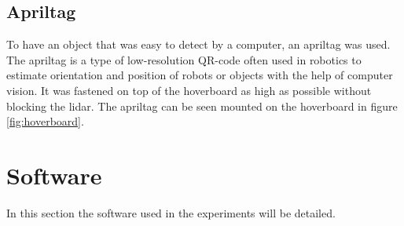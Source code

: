 \documentclass[nofilelist]{cslthse-msc}
\begin{document}
\subsection{Apriltag}
To have an object that was easy to detect by a computer, an apriltag was used. The apriltag is a type of low-resolution QR-code often used in robotics to estimate orientation and position of robots or objects with the help of computer vision. It was fastened on top of the hoverboard as high as possible without blocking the lidar. The apriltag can be seen mounted on the hoverboard in figure \ref{fig:hoverboard}.




\section{Software}
In this section the software used in the experiments will be detailed.
\end{document}
